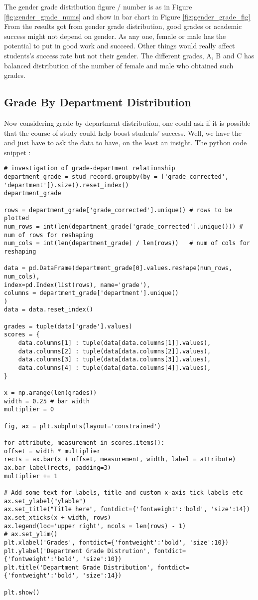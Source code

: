 The gender grade distribution figure / number is as in Figure \ref{fig:gender_grade_nums} and show in bar chart in Figure \ref{fig:gender_grade_fig}
From the results got from gender grade distribution, good grades or academic success might not depend on gender. As any one, female or male has the potential to put in good work and succeed. Other things would really affect students's success rate but not their gender. The different grades, A, B and C has balanced distribution of the number of female and male who obtained such grades. 



\subsection{Grade By Department Distribution}
Now considering grade by department distribution, one could ask if it is possible that the course of study could help boost students' success. Well, we have the and just have to ask the data to have, on the least an insight. 
The python code snippet :

\begin{verbatim}
# investigation of grade-department relationship
department_grade = stud_record.groupby(by = ['grade_corrected', 'department']).size().reset_index()
department_grade

rows = department_grade['grade_corrected'].unique() # rows to be plotted
num_rows = int(len(department_grade['grade_corrected'].unique())) # num of rows for reshaping
num_cols = int(len(department_grade) / len(rows))   # num of cols for reshaping

data = pd.DataFrame(department_grade[0].values.reshape(num_rows, num_cols), 
index=pd.Index(list(rows), name='grade'),
columns = department_grade['department'].unique()
)
data = data.reset_index()

grades = tuple(data['grade'].values)
scores = {
	data.columns[1] : tuple(data[data.columns[1]].values),
	data.columns[2] : tuple(data[data.columns[2]].values),
	data.columns[3] : tuple(data[data.columns[3]].values),
	data.columns[4] : tuple(data[data.columns[4]].values),
}

x = np.arange(len(grades))
width = 0.25 # bar width
multiplier = 0

fig, ax = plt.subplots(layout='constrained')

for attribute, measurement in scores.items():
offset = width * multiplier 
rects = ax.bar(x + offset, measurement, width, label = attribute)
ax.bar_label(rects, padding=3)
multiplier += 1

# Add some text for labels, title and custom x-axis tick labels etc
ax.set_ylabel("ylable")
ax.set_title("Title here", fontdict={'fontweight':'bold', 'size':14})
ax.set_xticks(x + width, rows)
ax.legend(loc='upper right', ncols = len(rows) - 1)
# ax.set_ylim()
plt.xlabel('Grades', fontdict={'fontweight':'bold', 'size':10})
plt.ylabel('Department Grade Distrution', fontdict={'fontweight':'bold', 'size':10})
plt.title('Department Grade Distribution', fontdict={'fontweight':'bold', 'size':14})

plt.show()
\end{verbatim}

